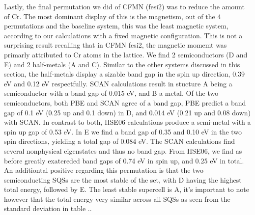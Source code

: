 Lastly, the final permutation we did of CFMN (fesi2) was to reduce the amount of Cr. The most dominant display of this is the magnetism, out of the 4 permutations and the baseline system, this was the least magnetic system, according to our calculations with a fixed magnetic configuration. This is not a surprising result recalling that in CFMN fesi2, the magnetic momemt was primarly attributed to Cr atoms in the lattice. We find 2 semiconductors (D and E) and 2 half-metals (A and C). Similar to the other systems discussed in this section, the half-metals display a sizable band gap in the spin up direction, 0.39 eV and 0.12 eV respectfully. SCAN calculations result in stucture A being a semiconductor with a band gap of 0.015 eV, and B a metal. Of the two semiconductors, both PBE and SCAN agree of a band gap, PBE predict a band gap of 0.1 eV (0.25 up and 0.1 down) in D, and 0.014 eV (0.21 up and 0.08 down) with SCAN. In contrast to both, HSE06 calculations produce a semi-metal with a spin up gap of 0.53 eV. In E we find a band gap of 0.35 and 0.10 eV in the two spin directions, yielding a total gap of 0.084 eV. The SCAN calculations find several nonphysical eigenstates and thus no band gap. From HSE06, we find as before greatly exatereded band gaps of 0.74 eV in spin up, and 0.25 eV in total. An additiontal positive regarding this permutation is that the two semiconducting SQSs are the most stable of the set, with D having the highest total energy, followed by E. The least stable supercell is A, it's important to note however that the total energy very similar across all SQSs as seen from the standard deviation in table .. 


